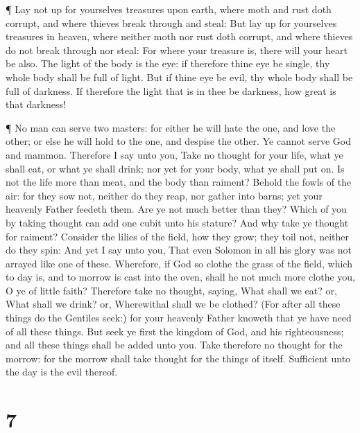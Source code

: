  ¶ Lay not up for yourselves treasures upon earth, where
moth and rust doth corrupt, and where thieves break through and steal:
 But lay up for yourselves treasures in heaven, where
neither moth nor rust doth corrupt, and where thieves do not break
through nor steal:  For where your treasure is, there will
your heart be also.  The light of the body is the eye: if
therefore thine eye be single, thy whole body shall be full of light.
 But if thine eye be evil, thy whole body shall be full of
darkness. If therefore the light that is in thee be darkness, how great
is that darkness!

 ¶ No man can serve two masters: for either he will hate
the one, and love the other; or else he will hold to the one, and
despise the other. Ye cannot serve God and mammon. 
Therefore I say unto you, Take no thought for your life, what ye shall
eat, or what ye shall drink; nor yet for your body, what ye shall put
on. Is not the life more than meat, and the body than raiment?
 Behold the fowls of the air: for they sow not, neither do
they reap, nor gather into barns; yet your heavenly Father feedeth them.
Are ye not much better than they?  Which of you by taking
thought can add one cubit unto his stature?  And why take
ye thought for raiment? Consider the lilies of the field, how they grow;
they toil not, neither do they spin:  And yet I say unto
you, That even Solomon in all his glory was not arrayed like one of
these.  Wherefore, if God so clothe the grass of the field,
which to day is, and to morrow is cast into the oven, shall he not much
more clothe you, O ye of little faith?  Therefore take no
thought, saying, What shall we eat? or, What shall we drink? or,
Wherewithal shall we be clothed?  (For after all these
things do the Gentiles seek:) for your heavenly Father knoweth that ye
have need of all these things.  But seek ye first the
kingdom of God, and his righteousness; and all these things shall be
added unto you.  Take therefore no thought for the morrow:
for the morrow shall take thought for the things of itself. Sufficient
unto the day is the evil thereof.

\hypertarget{section-6}{%
\section{7}\label{section-6}}


